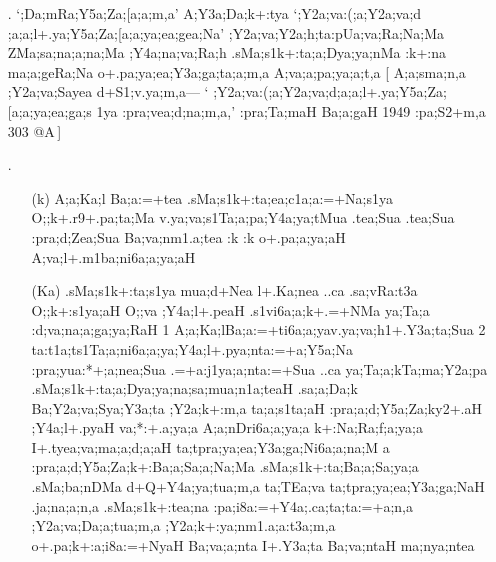 \begin{spacing}{1.15}
\begin{itemize}
 \item[{\sktf 6}.]  `{\sktf ;Da;mRa;Y5a;Za;[a;a;m,a}' {\sktf
A;Y3a;Da;k+:tya} `{\sktf ;Y2a;va:(;a;Y2a;va;d%
;a;a;l+.ya\ZF{-};Y5a;Za;[a;a;ya;ea;gea;Na}' {\sktf
;Y2a;va;Y2a;h;ta\ZF{-}:pUa;va;Ra;Na;Ma} {\sktf ZMa;sa;na;a;na;Ma
;Y4a;na;va;Ra;h\ZF{,} .sMa;s1k+:ta;a;Dya;ya;nMa
:k+:na ma;a;geRa;Na o+.pa;ya;ea;Y3a;ga;ta;a;m,a
A;va;a;pa;ya;a;t,a} [{\sktf
A;a;sma;n,a ;Y2a;va;Sa{yea} d+S1;v.ya;m,a}{\rm ---} `{\sktf
;Y2a;va:(;a;Y2a;va;d;a;a;l+.ya\ZF{-};Y5a;Za;[a;a;ya;ea;ga;s%
1ya :pra;vea;d;na;m,a},' {\sktf :pra;Ta;maH Ba;a;gaH 1949\ZF{,}
:pa;S2+m,a 303 @A}\,]   
 
 \item[{\sktf 7}.] \begin{itemize}
  \item[({\sktf k})]  {\sktf A;a;Ka;l Ba;a:=+tea
.sMa;s1k+:ta;ea;c1a;a:=+Na;s1ya O;;k+.r9+.pa;ta;Ma
v.ya;va;s1Ta;a;pa;Y4a;ya;tMua .tea;Sua .tea;Sua :pra;d;Zea;Sua
Ba;va;nm1.a;tea :k :k o+.pa;a;ya;aH
A;va;l+.m1ba;ni6a;a;ya;aH} 
          
  \item[({\sktf Ka})] {\sktf .sMa;s1k+:ta;s1ya
mua;d+Nea l+.Ka;nea ..ca .sa;vRa:t3a
O;;k+:s1ya;aH O;;va ;Y4a;l+.peaH .s1vi6a;a;k+.=+NMa
\ZF{(}ya;Ta;a\ZF{,} :d;va;na;a;ga;ya;RaH\ZF{)} \ZF{(}1\ZF{)}
A;a;Ka;l\ZF{-}Ba;a:=+ti6a;a;ya\ZF{-}v.ya;va;h1+.Y3a;ta;Sua\ZF{,}
\ZF{(}2\ZF{)} ta:t1a;ts1Ta;a;ni6a;a;ya\ZF{-};Y4a;l+.pya;nta:=+a;Y5a;Na
:pra;yua:*+;a;nea;Sua .=+a:j1ya;a;nta:=+Sua ..ca
ya;Ta;a;k{Ta};ma;Y2a;pa .sMa;s1k+:ta;a;Dya;ya;na;sa;mua;n1a;teaH%
 .sa;a;Da;k Ba;Y2a;va;Sya;Y3a;ta ;Y2a;k+:m,a
ta;a;s1ta;aH :pra;a;d;Y5a;Za;ky2+.aH ;Y4a;l+.pyaH
\ZF{(}va;*:+.a;ya;a\ZF{,}
A;a;nDri6a;a;ya;a\ZF{,} k+:Na;Ra;f;a;ya;a\ZF{,}
I+.tyea;va;ma;a;d;a;aH\ZF{)} ta;tpra;ya;ea;Y3a;ga;Ni6a;a;na;M%
a :pra;a;d;Y5a;Za;k+:Ba;a;Sa;a;Na;Ma .sMa;s1k+:ta;Ba;a;Sa;ya;a .sMa;ba;nDMa d+Q+Y4a;ya;tua;m,a\ZF{,} ta;TEa;va ta;tpra;ya;ea;Y3a;ga;NaH .ja;na;a;n,a
.sMa;s1k+:tea;na :pa;i8a:=+Y4a;.ca;ta;ta:=+a;n,a
;Y2a;va;Da;a;tua;m,a\ZF{,} ;Y2a;k+:ya;nm1.a;a:t3a;m,a
o+.pa;k+:a;i8a:=+NyaH Ba;va;a;nta I+.Y3a;ta
Ba;va;ntaH ma;nya;ntea}
 \end{itemize}
\end{itemize}
\end{spacing}

